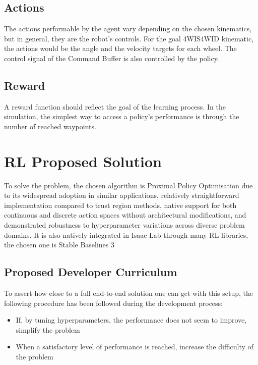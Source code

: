 \documentclass[11pt,a4paper,twocolumn]{article}
\begin{document}
\subsection{Actions}
The actions performable by the agent vary depending on the chosen kinematics, but in general, they are the robot's controls. For the goal 4WIS4WID kinematic, the actions would be the angle and the velocity targets for each wheel. The control signal of the Command Buffer is also controlled by the policy.

\subsection{Reward}
A reward function should reflect the goal of the learning process. In the simulation, the simplest way to access a policy's performance is through the number of reached waypoints. 

\section{RL Proposed Solution}
To solve the problem, the chosen algorithm is Proximal Policy Optimisation \cite{Schulman2017ProximalPO} due to its widespread adoption in similar applications, relatively straightforward implementation compared to trust region methods, native support for both continuous and discrete action spaces without architectural modifications, and demonstrated robustness to hyperparameter variations across diverse problem domains. It is also natively integrated in Isaac Lab through many RL libraries, the chosen one is Stable Baselines 3 \cite{raffin2021stable}

\subsection{Proposed Developer Curriculum}
To assert how close to a full end-to-end solution one can get with this setup, the following procedure has been followed during the development process:
\begin{itemize}
    \item If, by tuning hyperparameters, the performance does not seem to improve, simplify the problem
    \item When a satisfactory level of performance is reached, increase the difficulty of the problem
\end{itemize}
\end{document}
